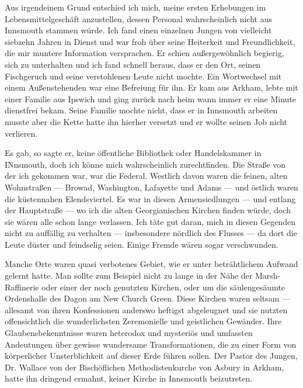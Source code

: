 Aus irgendeinem Grund entschied ich mich, meine ersten Erhebungen im Lebensmittelgeschäft anzustellen, dessen Personal wahrscheinlich nicht aus Innsmouth stammen würde. Ich fand einen einzelnen Jungen von vielleicht siebzehn Jahren in Dienst und war froh über seine Heiterkeit und Freundlichkeit, die mir muntere Information versprachen. Er schien außergewöhnlich begierig, sich zu unterhalten und ich fand schnell heraus, dass er den Ort, seinen Fischgeruch und seine verstohlenen Leute nicht mochte. Ein Wortwechsel mit einem Außenstehenden war eine Befreiung für ihn. Er kam aus Arkham, lebte mit einer Familie aus Ipswich und ging zurück nach heim wann immer er eine Minute dienstfrei bekam. Seine Familie mochte nicht, dass er in Innsmouth arbeiten musste aber die Kette hatte ihn hierher versetzt und er wollte seinen Job nicht verlieren.

Es gab, so sagte er, keine öffentliche Bibliothek oder Handelskammer in INnsmouth, doch ich könne mich wahrscheinlich zurechtfinden. Die Straße von der ich gekommen war, war die Federal. Westlich davon waren die feinen, alten Wohnstraßen --- Browad, Washington, Lafayette und Adams --- und östlich waren die küstennahen Elendsviertel. Es war in diesen Armensiedlungen --- und entlang der Hauptstraße --- wo ich die alten Georgianischen Kirchen finden würde, doch sie wären alle schon lange verlassen. Ich täte gut daran, mich in diesen Gegenden nicht zu auffällig zu verhalten --- insbesondere nördlich des Flusses --- da dort die Leute düster und feindselig seien. Einige Fremde wären sogar verschwunden.

Manche Orte waren quasi verbotenes Gebiet, wie er unter beträhtlichem Aufwand gelernt hatte. Man sollte zum Beispiel nicht zu lange in der Nähe der Marsh-Raffinerie oder einer der noch genutzten Kirchen, oder um die säulengesäumte Ordenshalle des Dagon am New Church Green. Diese Kirchen waren seltsam --- allesamt von ihren Konfessionen anderswo heftigst abgeleugnet und sie nutzten offensichtlich die wunderlichsten Zeremonielle und geistlichen Gewänder. Ihre Glaubensbekenntnisse waren heterodox und mysteriös und umfassten Andeutungen über gewisse wundersame Transformationen, die zu einer Form von körperlicher Unsterblichkeit auf dieser Erde führen sollen. Der Pastor des Jungen, Dr. Wallace von der Bischöflichen Methodistenkurche von Asbury in Arkham, hatte ihn dringend ermahnt, keiner Kirche in Innsmouth beizutreten.

